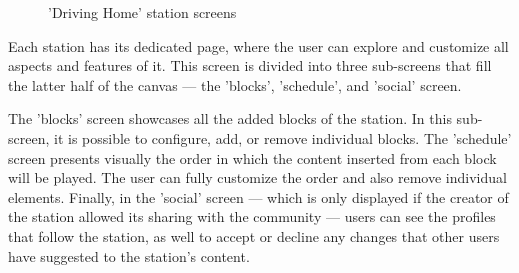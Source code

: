 \begin{figure}[htbp]
	\centering
	 \qquad
	 \qquad
	\caption{'Driving Home' station screens}
	\label{fig:mfp1}
\end{figure}



Each station has its dedicated page, where the user can explore and customize all aspects and features of it. This screen is divided into three sub-screens that fill the latter half of the canvas — the 'blocks', 'schedule', and 'social' screen.

The 'blocks' screen showcases all the added blocks of the station. In this sub-screen, it is possible to configure, add, or remove individual blocks. The 'schedule' screen presents visually the order in which the content inserted from each block will be played. The user can fully customize the order and also remove individual elements. Finally, in the 'social' screen — which is only displayed if the creator of the station allowed its sharing with the community — users can see the profiles that follow the station, as well to accept or decline any changes that other users have suggested to the station's content.

